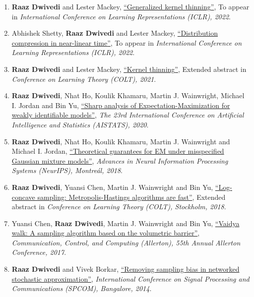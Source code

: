 \documentclass[margin,centered]{res}
\newcommand{\ptitle}[1]{``#1''}
\begin{document}
\begin{resume}
\begin{enumerate}[label={C\arabic*.},leftmargin=*]
\item \textbf{Raaz Dwivedi} and Lester Mackey, \href{https://arxiv.org/abs/2110.01593}{\ptitle{{Generalized kernel thinning}}}, To appear in \textit{International Conference on Learning Representations (ICLR), 2022}.
\item Abhishek Shetty, \textbf{Raaz Dwivedi} and Lester Mackey, \href{https://arxiv.org/abs/2111.07941}{\ptitle{{Distribution compression in near-linear time}}},  To appear in \textit{International Conference on Learning Representations (ICLR), 2022}.
\item \textbf{Raaz Dwivedi} and Lester Mackey, \href{https://arxiv.org/abs/2105.05842}{\ptitle{{Kernel thinning}}}, Extended abstract in \emph{Conference
on Learning Theory (COLT), 2021}.
\item \textbf{Raaz Dwivedi}\eqc, {Nhat Ho}\eqc, Koulik Khamaru\eqc, Martin
J. Wainwright, Michael I. Jordan and Bin Yu, \href{https://arxiv.org/pdf/1902.00194.pdf} {\ptitle{Sharp analysis of Expectation-Maximization for weakly identifiable models}},  \emph{ The 23rd International Conference on Artificial Intelligence and Statistics (AISTATS), 2020}.
\item \textbf{Raaz Dwivedi}\eqc, {Nhat Ho}\eqc, Koulik Khamaru\eqc,
Martin
J. Wainwright and
Michael I. Jordan, \href{https://people.eecs.berkeley.edu/~minhnhat/EM_misspecified_unified.pdf}
{\ptitle{Theoretical guarantees for EM under misspecified Gaussian mixture
models}},
\emph{Advances in Neural Information Processing Systems (NeurIPS), Montre{\'a}l, 2018}.
\item \textbf{Raaz Dwivedi}\eqc, Yuansi Chen\eqc, Martin
J. Wainwright and Bin Yu, \href{https://jmlr.csail.mit.edu/papers/volume20/19-306/19-306.pdf}
{
\ptitle{Log-concave sampling:
Metropolis-Hastings algorithms are fast}}, Extended abstract in \emph{Conference
on Learning
Theory (COLT), Stockholm, 2018}. 
\item Yuansi Chen\eqc, \textbf{Raaz Dwivedi}\eqc, Martin
J. Wainwright and Bin Yu, \href{https://jmlr.org/papers/volume19/18-158/18-158.pdf}
{\ptitle{Vaidya walk: A sampling algorithm based on the volumetric barrier}},
\textit{Communication, Control, and Computing (Allerton),
55th Annual Allerton Conference, 2017}.
\item \textbf{Raaz Dwivedi} and Vivek Borkar, \href{https://ieeexplore.ieee.org/abstract/document/6983986/}
{\ptitle{Removing sampling bias in networked stochastic approximation}},
\textit{International
Conference on Signal Processing and Communications (SPCOM), Bangalore, 2014}.
\end{enumerate}


\end{resume}
\end{document}
